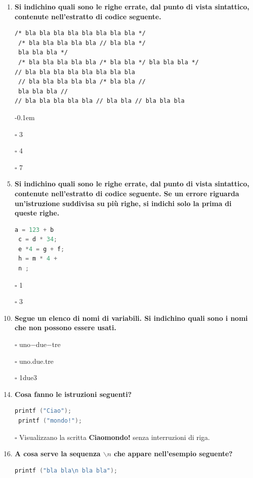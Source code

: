 \documentclass[11pt]{article}
\begin{document}
\begin{enumerate}
\item {\bf Si indichino quali sono le righe errate, dal punto di vista sintattico, contenute nell'estratto di codice seguente. }
\begin{lstlisting}[]
/* bla bla bla bla bla bla bla bla */
 /* bla bla bla bla bla // bla bla */
 bla bla bla */
 /* bla bla bla bla bla /* bla bla */ bla bla bla */
// bla bla bla bla bla bla bla bla
 // bla bla bla bla bla /* bla bla //
 bla bla bla //
// bla bla bla bla bla // bla bla // bla bla bla
\end{lstlisting}
\itemsep-0.1em


\item[$\square$] 3
\item[$\square$] 4
\item[$\square$] 7

\item {\bf Si indichino quali sono le righe errate, dal punto di vista sintattico, contenute nell'estratto di codice seguente. Se un errore riguarda un'istruzione
suddivisa su pi\`{u} righe, si indichi solo la prima di queste righe.}
 \begin{lstlisting}[language=c]
 a = 123 + b
 c = d * 34;
 e *4 = g + f;
 h = m * 4 +
 n ;
 \end{lstlisting}
\item [\nonumber]
\item [\nonumber]
\item[$\square$] 1
\item[$\square$] 3

 \item {\bf Segue un elenco di nomi di variabili. Si indichino quali sono i nomi che non possono essere usati.}

\item[$\square$] uno$-$due$-$tre
\item[$\square$]  uno.due.tre
\item[$\square$] 1due3

 \item {\bf Cosa fanno le istruzioni seguenti?}
 
 \begin{lstlisting}[language=c]
 printf ("Ciao");
 printf ("mondo!");
  \end{lstlisting}
 
\item[$\square$] Visualizzano la scritta {\bf Ciaomondo!} senza interruzioni di riga.
 
 
 \item  {\bf A cosa serve la sequenza $\backslash n$ che appare nell'esempio seguente?}
 \begin{lstlisting}[language=c]
 printf ("bla bla\n bla bla");
 \end{lstlisting}
 

\end{enumerate}
\end{document}
